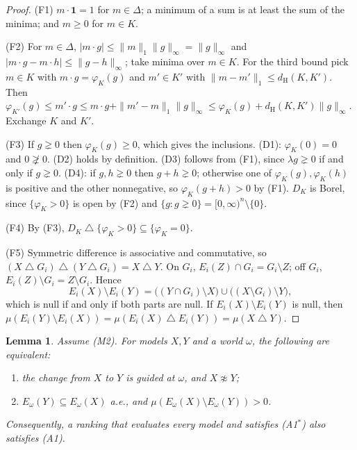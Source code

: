 \documentclass[11pt]{article}
\newtheorem{lemma}[theorem]{Lemma}
\theoremstyle{definition}
\newcommand{\one}{\mathbf 1}
\newcommand{\dH}{d_{\mathrm H}}
\newcommand{\sd}{\mathbin{\triangle}}
\newcommand{\gneqz}{\gneq 0}
\begin{document}
\begin{proof}
(F1) $m\cdot\one=1$ for $m\in\Delta$; a minimum of a sum is at least the sum of the minima; and $m\ge0$ for $m\in K$.

(F2) For $m\in\Delta$, $|m\cdot g|\le\|m\|_1\|g\|_\infty=\|g\|_\infty$ and $|m\cdot g-m\cdot h|\le\|g-h\|_\infty$; take minima over $m\in K$. For the third bound pick $m\in K$ with $m\cdot g=\varphi_K(g)$ and $m'\in K'$ with $\|m-m'\|_1\le\dH(K,K')$. Then $\varphi_{K'}(g)\le m'\cdot g\le m\cdot g+\|m'-m\|_1\|g\|_\infty\le\varphi_K(g)+\dH(K,K')\|g\|_\infty$. Exchange $K$ and $K'$.

(F3) If $g\gneqz$ then $\varphi_K(g)\ge0$, which gives the inclusions. (D1): $\varphi_K(0)=0$ and $0\not\gneqz$. (D2) holds by definition. (D3) follows from (F1), since $\lambda g\gneqz$ if and only if $g\gneqz$. (D4): if $g,h\gneqz$ then $g+h\gneqz$; otherwise one of $\varphi_K(g),\varphi_K(h)$ is positive and the other nonnegative, so $\varphi_K(g+h)>0$ by (F1). $D_K$ is Borel, since $\{\varphi_K>0\}$ is open by (F2) and $\{g:g\gneqz\}=[0,\infty)^n\setminus\{0\}$.

(F4) By (F3), $D_K\sd\{\varphi_K>0\}\subseteq\{\varphi_K=0\}$.

(F5) Symmetric difference is associative and commutative, so $(X\sd G_i)\sd(Y\sd G_i)=X\sd Y$. On $G_i$, $E_i(Z)\cap G_i=G_i\setminus Z$; off $G_i$, $E_i(Z)\setminus G_i=Z\setminus G_i$. Hence
\[
E_i(X)\setminus E_i(Y)=\big((Y\cap G_i)\setminus X\big)\cup\big((X\setminus G_i)\setminus Y\big),
\]
which is null if and only if both parts are null. If $E_i(X)\setminus E_i(Y)$ is null, then $\mu(E_i(Y)\setminus E_i(X))=\mu(E_i(X)\sd E_i(Y))=\mu(X\sd Y)$.
\end{proof}

\begin{lemma}\label{lem:guidance}
Assume (M2). For models $X,Y$ and a world $\omega$, the following are equivalent:
\begin{enumerate}[label=(\arabic*)]
\item the change from $X$ to $Y$ is guided at $\omega$, and $X\not\approx Y$;
\item $E_\omega(Y)\subseteq E_\omega(X)$ a.e., and $\mu(E_\omega(X)\setminus E_\omega(Y))>0$.
\end{enumerate}
Consequently, a ranking that evaluates every model and satisfies (A1$^*$) also satisfies (A1).
\end{lemma}
\end{document}
